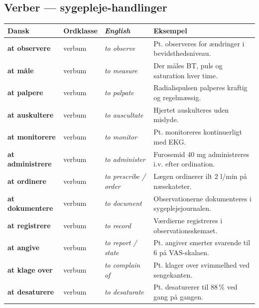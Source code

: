 \documentclass[11pt,a4paper]{report}
\makeatletter
\newcommand{\eng}[1]{\textcolor{en}{\itshape #1}}       %
\newcommand{\da}[1]{\textbf{#1}}
\newenvironment{glos}{%
  \small\renewcommand{\arraystretch}{1.35}
  \begin{longtable}{@{}>{\raggedright\arraybackslash}p{3.3cm}
                        >{\raggedright\arraybackslash}p{1.7cm}
                        >{\raggedright\arraybackslash}p{3.2cm}
                        >{\raggedright\arraybackslash}p{6.0cm}@{}}
  \toprule
  \textbf{Dansk} & \textbf{Ordklasse} & \eng{English} & \textbf{Eksempel} \\ \midrule
  \endhead
}{\bottomrule\end{longtable}}
\makeatother
\begin{document}
\subsection{Verber --- sygepleje-handlinger}
\begin{glos}
\da{at observere} & verbum & \eng{to observe} & Pt. observeres for ændringer i bevidsthedsniveau. \\
\da{at måle} & verbum & \eng{to measure} & Der måles BT, puls og saturation hver time. \\
\da{at palpere} & verbum & \eng{to palpate} & Radialispulsen palperes kraftig og regelmæssig. \\
\da{at auskultere} & verbum & \eng{to auscultate} & Hjertet auskulteres uden mislyde. \\
\da{at monitorere} & verbum & \eng{to monitor} & Pt. monitoreres kontinuerligt med EKG. \\
\da{at administrere} & verbum & \eng{to administer} & Furosemid 40 mg administreres i.v. efter ordination. \\
\da{at ordinere} & verbum & \eng{to prescribe / order} & Lægen ordinerer ilt 2 l/min på næsekateter. \\
\da{at dokumentere} & verbum & \eng{to document} & Observationerne dokumenteres i sygeplejejournalen. \\
\da{at registrere} & verbum & \eng{to record} & Værdierne registreres i observationsskemaet. \\
\da{at angive} & verbum & \eng{to report / state} & Pt. angiver smerter svarende til 6 på VAS-skalaen. \\
\da{at klage over} & verbum & \eng{to complain of} & Pt. klager over svimmelhed ved sengekanten. \\
\da{at desaturere} & verbum & \eng{to desaturate} & Pt. desaturerer til 88\,\% ved gang på gangen. \\
\end{glos}
\end{document}

